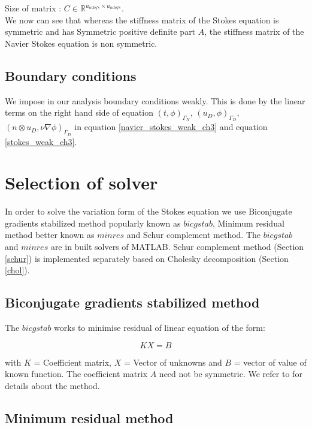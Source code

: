 \documentclass[a4paper,openany]{book}
\begin{document}
Size of matrix : $C \in \mathbb{R}^{u_{ndofs} \times u_{ndofs}}$. \\

We now can see that whereas the stiffness matrix of the Stokes equation is symmetric and has Symmetric positive definite part $A$, the stiffness matrix of the Navier Stokes equation is non symmetric.

\subsection{Boundary conditions}

We impose in our analysis boundary conditions weakly. This is done by the linear terms on the right hand side of equation  $(t,\phi)_{\Gamma_N}$, $(u_D,\phi)_{\Gamma_D}$, \linebreak $(n \otimes u_D, \nu \nabla \phi)_{\Gamma_D}$ in equation \ref{navier_stokes_weak_ch3} and equation \ref{stokes_weak_ch3}.

\section{Selection of solver}

In order to solve the variation form of the Stokes equation we use Biconjugate gradients stabilized method popularly known as $bicgstab$, Minimum residual method better known as $minres$ and Schur complement method. The $bicgstab$ and $minres$ are in built solvers of MATLAB. Schur complement method (Section \ref{schur}) is implemented separately based on Cholesky decomposition (Section \ref{chol}).

\subsection{Biconjugate gradients stabilized method}

The $bicgstab$ works to minimise residual of linear equation of the form:

\begin{equation} \label{linear_matrix_equation}
KX = B
\end{equation}

with $K$ = Coefficient matrix, $X$ = Vector of unknowns and $B$ = vector of value of known function. The coefficient matrix $A$ need not be symmetric. We refer to \cite{bicgstab} for details about the method.\\

\subsection{Minimum residual method} 
\end{document}
